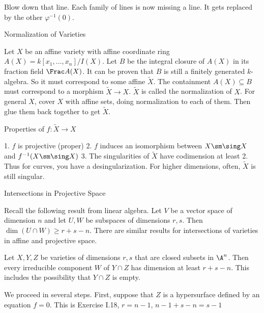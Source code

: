  
 Blow down that line. Each family of lines is now missing a line. It gets replaced by the other $\varphi^{-1}(0)$. 







Normalization of Varieties

Let $X$ be an affine variety with affine coordinate ring $A(X)= k[x_1,\ldots,x_n]/ I(X)$. Let $B$ be the integral closure of $A(X)$ in its fraction field $\Frac A(X)$. It can be proven that $B$ is still a finitely generated $k$-algebra. So it must correspond to some affine $\tilde{X}$. The containment $A(X) \subseteq B$ must correspond to a morphism $\tilde{X} \to X$. $\tilde{X}$ is called the normalization of $X$. For general $X$, cover $X$ with affine sets, doing normalization to each of them. Then glue them back together to get $\tilde{X}$. 

Properties of $f: \tilde{X} \to X$

1. $f$ is projective (proper)
2. $f$ induces an isomorphism between $X \sm \sing X$ and $f^{-1}(X \sm \sing X)$
3. The singularities of $\tilde{X}$ have codimension at least 2. Thus for curves, you have a desingularization. For higher dimensions, often, $\tilde{X}$ is still singular.



Intersections in Projective Space

Recall the following result from linear algebra. Let $V$ be a vector space of dimension $n$ and let $U,W$ be subspaces of dimensions $r,s$. Then $\dim (U \cap W) \geq r + s - n$. There are similar results for intersections of varieties in affine and projective space. 


\begin{prop}
Let $X,Y,Z$ be varieties of dimensions $r,s$ that are closed subsets in $\A^n$. Then every irreducible component $W$ of $Y \cap Z$ has dimension at least $r+s-n$. This includes the possibility that $Y \cap Z$ is empty. 
\end{prop}

\pf We proceed in several steps. First, suppose that $Z$ is a hypersurface defined by an equation $f=0$. This is Exercise I.18, $r= n - 1$, $n - 1 + s - n= s - 1$

